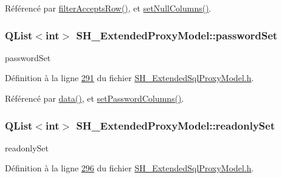 Référencé par \hyperlink{classSH__ExtendedProxyModel_a1eda169699702a7bfed4dfa8718c0b86}{filter\-Accepts\-Row()}, et \hyperlink{classSH__ExtendedProxyModel_a2a5734c26bb72fb11e50b9036914d987}{set\-Null\-Columns()}.

\hypertarget{classSH__ExtendedProxyModel_a9616e7be442b560e260e1db9034143bc}{
\subsubsection[{password\-Set}]{\setlength{\rightskip}{0pt plus 5cm}Q\-List$<$int$>$ S\-H\-\_\-\-Extended\-Proxy\-Model\-::password\-Set\hspace{0.3cm}{\ttfamily [private]}}}\label{classSH__ExtendedProxyModel_a9616e7be442b560e260e1db9034143bc}


password\-Set 



Définition à la ligne \hyperlink{SH__ExtendedSqlProxyModel_8h_source_l00291}{291} du fichier \hyperlink{SH__ExtendedSqlProxyModel_8h_source}{S\-H\-\_\-\-Extended\-Sql\-Proxy\-Model.\-h}.



Référencé par \hyperlink{classSH__ExtendedProxyModel_afbc947efbe1107fc5bf8926c52902a1c}{data()}, et \hyperlink{classSH__ExtendedProxyModel_a4bbea95e7483aeeef4709c12e5ef61c5}{set\-Password\-Columns()}.

\hypertarget{classSH__ExtendedProxyModel_ad8e1da8be7d34eefe243a7707be8b166}{
\subsubsection[{readonly\-Set}]{\setlength{\rightskip}{0pt plus 5cm}Q\-List$<$int$>$ S\-H\-\_\-\-Extended\-Proxy\-Model\-::readonly\-Set\hspace{0.3cm}{\ttfamily [private]}}}\label{classSH__ExtendedProxyModel_ad8e1da8be7d34eefe243a7707be8b166}


readonly\-Set 



Définition à la ligne \hyperlink{SH__ExtendedSqlProxyModel_8h_source_l00296}{296} du fichier \hyperlink{SH__ExtendedSqlProxyModel_8h_source}{S\-H\-\_\-\-Extended\-Sql\-Proxy\-Model.\-h}.




